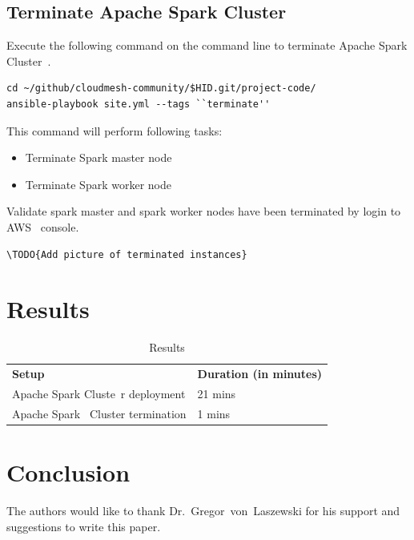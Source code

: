 \subsection{Terminate Apache Spark Cluster}

Execute the following command on the command line to terminate Apache
Spark Cluster~\cite{hid-sp18-511-www-spark}.

\begin{verbatim}
cd ~/github/cloudmesh-community/$HID.git/project-code/
ansible-playbook site.yml --tags ``terminate''
\end{verbatim}

This command will perform following tasks:

\begin{itemize}
	\item Terminate Spark master node
	\item Terminate Spark worker node
\end{itemize}

Validate spark master and spark worker nodes have been terminated by login to AWS~\cite{hid-sp18-511-www-aws} console.

\begin{verbatim}
\TODO{Add picture of terminated instances}
\end{verbatim}

\section{Results}

\begin{table}[hbt]
	\centering
	\caption{Results}\label{t:results-table}
	\begin{tabular}{ll} 
		\textbf{Setup} & \textbf{Duration (in minutes)} \\ 
		Apache Spark Cluste~\cite{hid-sp18-511-www-spark}r deployment & 21 mins \\
		Apache Spark~\cite{hid-sp18-511-www-spark} Cluster termination & 1 mins \\
	\end{tabular}
\end{table}


\section{Conclusion}



\begin{acks}

  The authors would like to thank Dr.~Gregor~von~Laszewski for his
  support and suggestions to write this paper.

\end{acks}


 

